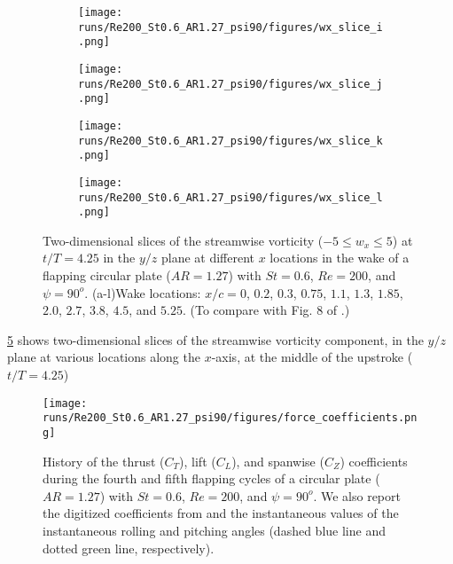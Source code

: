 \begin{figure}
\begin{subfigure}[t]{0.24\textwidth}
    \centering
    \texttt{[image: runs/Re200\_St0.6\_AR1.27\_psi90/figures/wx\_slice\_i.png]}
    \caption{}
    \label{fig:baseline_wx_slices:i}
  \end{subfigure}
  \begin{subfigure}[t]{0.24\textwidth}
    \centering
    \texttt{[image: runs/Re200\_St0.6\_AR1.27\_psi90/figures/wx\_slice\_j.png]}
    \caption{}
    \label{fig:baseline_wx_slices:j}
  \end{subfigure}
  \begin{subfigure}[t]{0.24\textwidth}
    \centering
    \texttt{[image: runs/Re200\_St0.6\_AR1.27\_psi90/figures/wx\_slice\_k.png]}
    \caption{}
    \label{fig:baseline_wx_slices:k}
  \end{subfigure}
  \begin{subfigure}[t]{0.24\textwidth}
    \centering
    \texttt{[image: runs/Re200\_St0.6\_AR1.27\_psi90/figures/wx\_slice\_l.png]}
    \caption{}
    \label{fig:baseline_wx_slices:l}
  \end{subfigure}
  \caption{Two-dimensional slices of the streamwise vorticity ($-5 \leq w_x \leq 5$) at $t / T = 4.25$ in the $y/z$ plane at different $x$ locations in the wake of a flapping circular plate ($AR = 1.27$) with $St = 0.6$, $Re = 200$, and $\psi = 90^o$. (a-l)Wake locations: $x / c = 0$, $0.2$, $0.3$, $0.75$, $1.1$, $1.3$, $1.85$, $2.0$, $2.7$, $3.8$, $4.5$, and $5.25$. (To compare with Fig. 8 of \citet{li_dong_2016}.)}
  \label{fig:baseline_wx_slices}
\end{figure}

\cref{fig:baseline_wx_slices} shows two-dimensional slices of the streamwise vorticity component, in the $y/z$ plane at various locations along the $x$-axis, at the middle of the upstroke ($t/T = 4.25$)

\begin{figure}
  \centering
  \texttt{[image: runs/Re200\_St0.6\_AR1.27\_psi90/figures/force\_coefficients.png]}
  \caption{History of the thrust ($C_T$), lift ($C_L$), and spanwise ($C_Z$) coefficients during the fourth and fifth flapping cycles of a circular plate ($AR = 1.27$) with $St = 0.6$, $Re = 200$, and $\psi = 90^o$. We also report the digitized coefficients from \cite{li_dong_2016} and the instantaneous values of the instantaneous rolling and pitching angles (dashed blue line and dotted green line, respectively).}
  \label{fig:baseline_force_coefficients}
\end{figure}

